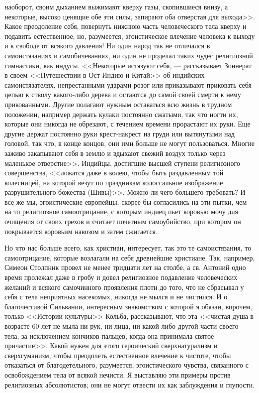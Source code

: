 \documentclass[12pt]{article}
\begin{document}
наоборот, своим дыханием выжимают кверху газы, скопившиеся внизу, а некоторые, высоко ценящие обе эти силы, запирают оба отверстая для выхода>>. Какое преодоление себя, повернуть нижнюю часть человеческого тела кверху и подавить естественное, но, разумеется, эгоистическое влечение человека к выходу и к свободе от всякого давления! Ни один народ так не отличался в самоистязаниях и самобичеваниях, ни один не проделал таких чудес религиозной гимнастики, как индусы. <<Некоторые истязуют себя, --- рассказывает Зоннерат в своем <<Путешествии в Ост-Индию и Китай>> об индийских самоистязателях, непрестанными ударами розог или приказывают приковать себя цепью к стволу какого-либо дерева и остаются до самой своей смерти к нему прикованными. Другие полагают нужным оставаться всю жизнь в трудном положении, например держать кулаки постоянно сжатыми, так что ногти их, которые они никогда не обрезают, с течением времени прорастают их руки. Еще другие держат постоянно руки крест-накрест на груди или вытянутыми над головой, так что, в конце концов, они ими больше не могут пользоваться. Многие заживо закапывают себя в землю и вдыхают свежий воздух только через маленькое отверстие>>. Индийцы, достигшие высшей ступени религиозного совершенства, <<ложатся даже в колею, чтобы быть раздавленным той колесницей, на которой везут по праздникам колоссальное изображение разрушительного божества (Шивы)>>. Можно ли чего большего требовать? И все же мы, эгоистические европейцы, скорее бы согласились на эти пытки, чем на то религиозное самоотрицание, с которым индиец пьет коровью мочу для очищения от своих грехов и считает почетным самоубийство, при котором он покрывается коровьим навозом и затем сжигается. 

Но что нас больше всего, как христиан, интересует, так это те самоистязания, то самоотрицание, которые возлагали на себя древнейшие христиане. Так, например, Симеон Столпник провел не менее тридцати лет на столбе, а св. Антоний одно время пролежал даже в гробу и довел религиозное подавление человеческих желаний и всякого самочинного проявления плоти до того, что не сбрасывал у себя с тела неприятных насекомых, никогда не мылся и не чистился. И о благочестивой Сильвании, интересным знакомством с которой я обязан, впрочем, только <<Истории культуры>> Кольба, рассказывают, что эта <<чистая душа в возрасте 60 лет не мыла ни рук, ни лица, ни какой-либо другой части своего тела, за исключением кончиков пальцев, когда она принимала святое причастие>>. Какой нужен для этого героический сверхнатурализм и сверхгуманизм, чтобы преодолеть естественное влечение к чистоте, чтобы отказаться от благодетельного, разумеется, эгоистического чувства, связанного с освобождением тела от всякой нечисти. Я выставляю эти примеры против религиозных абсолютистов; они не могут отвести их как заблуждения и глупости. 
\end{document}
